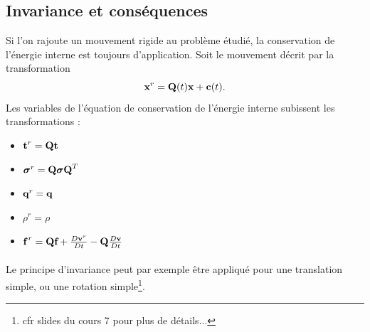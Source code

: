 \subsection{Invariance et conséquences}
Si l'on rajoute un mouvement rigide au problème étudié, la conservation de l'énergie interne est toujours d'application. Soit le mouvement décrit par la transformation
$$\textbf{x}^r=\textbf{Q}(t)\textbf{x}+\textbf{c}(t).$$ Les variables de l'équation de conservation de l'énergie interne subissent les transformations :
\begin{itemize}
\item $\textbf{t}^r=\textbf{Q}\textbf{t}$
\item $\boldsymbol{\sigma}^r=\textbf{Q}\boldsymbol{\sigma}\textbf{Q}^T$
\item $\textbf{q}^r=\textbf{q}$
\item $\rho^r=\rho$
\item $\textbf{f}^{\,r}=\textbf{Q}\textbf{f}+\frac{D\textbf{v}^r}{Dt}-\textbf{Q}\frac{D\textbf{v}}{Dt}$
\end{itemize}
 \paragraph{}
Le principe d'invariance peut par exemple être appliqué pour une translation simple, ou une rotation simple\footnote{cfr slides du cours 7 pour plus de détails...}.

